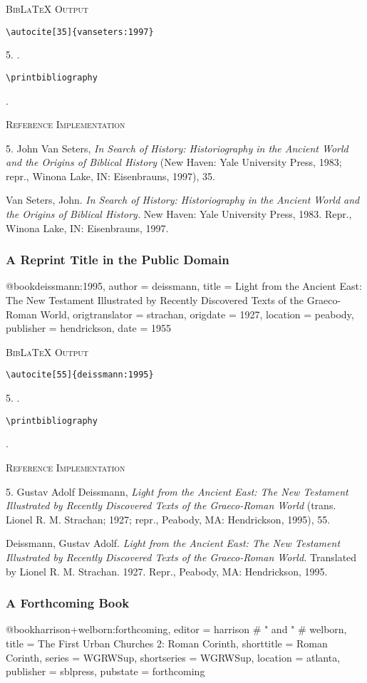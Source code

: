 \documentclass[a4paper]{article}
\newcommand\citetestns[3]{%
  {\textsc{BibLaTeX Output}\par
   \nobreak
   \texttt{\textbackslash autocite[#2]\{#3\}}\par
   \color{biblatex-colour}
   #1. \cite[#2]{#3}.\par
   \color{black}
   \texttt{\textbackslash printbibliography}\par
   \color{biblatex-colour}
   \hangindent\bibindent\bibentrycite{#3}.\par}}
\newenvironment{refimp}{%
  \begin{minipage}{\linewidth}
    \setlength{\parskip}{1ex}
    \textsc{Reference Implementation}\par
    \nobreak
    \color{reference-colour}
}{\end{minipage}}
\newenvironment{vb}{%
  \setlength{\parskip}{0pt}
  \verbatim}{\endverbatim}
\begin{document}
\citetestns{5}{35}{vanseters:1997}

\begin{refimp}
  5. John Van Seters, \emph{In Search of History: Historiography in the
  Ancient World and the Origins of Biblical History} (New Haven: Yale
  University Press, 1983; repr., Winona Lake, IN: Eisenbrauns, 1997), 35.

  \hangindent\bibindent Van Seters, John. \emph{In Search of History:
  Historiography in the Ancient World and the Origins of Biblical History.}
  New Haven: Yale University Press, 1983. Repr., Winona Lake, IN: Eisenbrauns,
  1997.
\end{refimp}

\subsubsection{A Reprint Title in the Public Domain}

\begin{vb}
@book{deissmann:1995,
  author = deissmann,
  title = {Light from the Ancient East: The New Testament
           Illustrated by Recently Discovered Texts of the
           Graeco-Roman World},
  origtranslator = strachan,
  origdate = {1927},
  location = peabody,
  publisher = hendrickson,
  date = {1955}
}
\end{vb}  

\citetestns{5}{55}{deissmann:1995}

\begin{refimp}
  5. Gustav Adolf Deissmann, \emph{Light from the Ancient East: The New Testament
  Illustrated by Recently Discovered Texts of the Graeco-Roman World} (trans.
  Lionel R. M. Strachan; 1927; repr., Peabody, MA: Hendrickson, 1995), 55.

  \hangindent\bibindent Deissmann, Gustav Adolf. \emph{Light from the Ancient
  East: The New Testament Illustrated by Recently Discovered Texts of the
  Graeco-Roman World.} Translated by Lionel R. M. Strachan. 1927. Repr., Peabody,
  MA: Hendrickson, 1995.
\end{refimp}

\subsubsection{A Forthcoming Book}

\begin{vb}
@book{harrison+welborn:forthcoming,
  editor = harrison # " and " # welborn,
  title = {The First Urban Churches 2: Roman Corinth},
  shorttitle = {Roman Corinth},
  series = WGRWSup,
  shortseries = {WGRWSup},
  location = atlanta,
  publisher = sblpress,
  pubstate = {forthcoming}
}
\end{vb}
\end{document}

